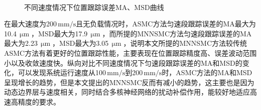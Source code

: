\begin{figure}[!t]
	 \\
	\caption{不同速度情况下位置跟踪误差MA、MSD曲线}
	\label{不同速度情况下位置跟踪误差MA、MSD曲线}
\end{figure}


在最大速度为200\,$\text{mm/s}$且无负载情况时，ASMC方法匀速段跟踪误差的MA最大为10.4\,$\text{$\upmu$m}$，MSD最大为17.9\,$\text{$\upmu$m}$，而所提的MNNSMC方法匀速段跟踪误差的MA最大为2.23\,$\text{$\upmu$m}$，MSD最大为3.05\,$\text{$\upmu$m}$，说明本文所提的MNNSMC方法较传统ASMC方法有着更好的位置跟踪性能，主要表现在位置跟踪精度高、误差波动范围小以及收敛速度快。纵向对比不同速度情况下匀速段跟踪误差的MA和MSD的变化，可以发现系统运行速度从100\,$\text{mm/s}$到200\,$\text{mm/s}$时，ASMC方法的MA和MSD呈现增长的趋势，但是本文提出的MNNSMC反而有减小的趋势，这主要也是因为动态边界层与速度相关，同时结合多核神经网络的扰动补偿作用，能较好地适应高速高精度的要求。

